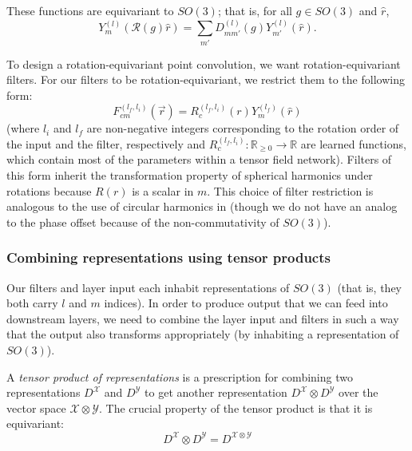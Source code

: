 \documentclass{article}
\begin{document}
These functions are equivariant to $SO(3)$; that is, for all $g \in SO(3)$ and $\hat{r}$,
\[Y_m^{(l)}(\mathcal{R}(g)\hat{r}) = \sum_{m'}D_{mm'}^{(l)}(g)Y_{m'}^{(l)}(\hat{r}).\]

To design a rotation-equivariant point convolution, we want rotation-equivariant filters. For our filters to be rotation-equivariant, we restrict them to the following form:
\begin{equation}\label{eq:filter}
F_{cm}^{(l_f, l_i)}(\vec{r}) = R^{(l_f, l_i)}_c(r)Y_m^{(l_f)}(\hat{r})
\end{equation}
(where $l_i$ and $l_f$ are non-negative integers corresponding to the rotation order of the input and the filter, respectively and $R^{(l_f, l_i)}_c : \mathbb{R}_{\ge 0} \rightarrow \mathbb{R}$ are learned functions, which contain most of the parameters within a tensor field network).  Filters of this form inherit the transformation property of spherical harmonics under rotations because $R(r)$ is a scalar in $m$.  This choice of filter restriction is analogous to the use of circular harmonics in \citet{Worrall_2017_CVPR} (though we do not have an analog to the phase offset because of the non-commutativity of $SO(3)$).

\subsubsection{Combining representations using tensor products}

Our filters and layer input each inhabit representations of $SO(3)$ (that is, they both carry $l$ and $m$ indices). In order to produce output that we can feed into downstream layers, we need to combine the layer input and filters in such a way that the output also transforms appropriately (by inhabiting a representation of $SO(3)$).

A {\em tensor product of representations} is a prescription for combining two representations $D^\mathcal{X}$ and $D^\mathcal{Y}$ to get another representation $D^\mathcal{X} \otimes D^\mathcal{Y}$ over the vector space $\mathcal{X} \otimes \mathcal{Y}$.  The crucial property of the tensor product is that it is equivariant:
\[D^{\mathcal{X}} \otimes D^{\mathcal{Y}} = D^{\mathcal{X}\otimes \mathcal{Y}}\]
\end{document}
